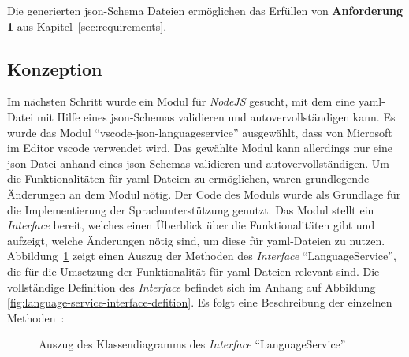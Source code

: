 Die generierten \ac{json}-Schema Dateien ermöglichen das Erfüllen von \textbf{Anforderung 1} aus Kapitel~\ref{sec:requirements}.

\subsection{Konzeption}

Im nächsten Schritt wurde ein Modul für \textit{NodeJS} gesucht, mit dem eine \ac{yaml}-Datei mit Hilfe eines \ac{json}-Schemas validieren
und autovervollständigen kann. Es wurde das Modul ``vscode-json-languageservice'' ausgewählt, dass von Microsoft im Editor \ac{vscode} verwendet
wird. Das gewählte Modul kann allerdings nur eine \ac{json}-Datei anhand eines \ac{json}-Schemas validieren
und autovervollständigen. Um die Funktionalitäten für \ac{yaml}-Dateien zu ermöglichen, waren grundlegende Änderungen an dem Modul nötig.
Der Code des Moduls wurde als Grundlage für die Implementierung der Sprachunterstützung genutzt.
Das Modul stellt ein \textit{Interface} bereit, welches einen Überblick über die Funktionalitäten gibt und aufzeigt, welche Änderungen
nötig sind, um diese für \ac{yaml}-Dateien zu nutzen.
\\
Abbildung~\ref{fig:language-service-interface-defition-excerpt} zeigt einen Auszug
der Methoden des \textit{Interface} ``LanguageService'',
die für die Umsetzung der Funktionalität für \ac{yaml}-Dateien relevant sind.
Die vollständige Definition des \textit{Interface} befindet sich im Anhang auf Abbildung \ref{fig:language-service-interface-defition}.
Es folgt eine Beschreibung der einzelnen Methoden~\cite{vscode-json-language-service}:

\begin{figure}[htp] %
  \centering
  \caption{Auszug des Klassendiagramms des \textit{Interface} ``LanguageService''}
  \label{fig:language-service-interface-defition-excerpt}
\end{figure}


